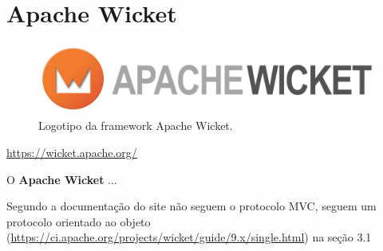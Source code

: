 \section{Apache Wicket}
\label{subsec:wicket}

\begin{figure}[H]
    \centering
    \includegraphics[scale=0.09]{images/wicket.png}
    \caption{Logotipo da framework Apache Wicket.}
    \label{fig:wicket}
\end{figure}

\href{https://wicket.apache.org/}{https://wicket.apache.org/}

\hspace{5mm} O \textbf{Apache Wicket} ...

Segundo a documentação do site não seguem o protocolo MVC, seguem um protocolo orientado ao objeto (\href{https://ci.apache.org/projects/wicket/guide/9.x/single.html}{https://ci.apache.org/projects/wicket/guide/9.x/single.html}) na seção 3.1